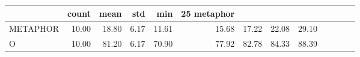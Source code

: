 \begin{tabular}{lrrrrrrrr}
\toprule
 & count & mean & std & min & 25%
metaphor &  &  &  &  &  &  &  &  \\
\midrule
METAPHOR & 10.00 & 18.80 & 6.17 & 11.61 & 15.68 & 17.22 & 22.08 & 29.10 \\
O & 10.00 & 81.20 & 6.17 & 70.90 & 77.92 & 82.78 & 84.33 & 88.39 \\
\bottomrule
\end{tabular}
